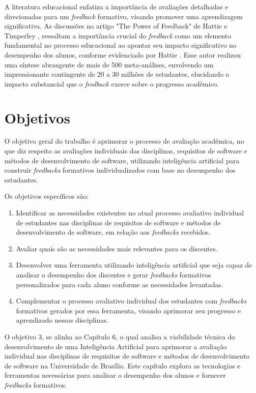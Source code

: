 A literatura educacional enfatiza a importância de avaliações detalhadas e direcionadas para um \textit{feedback} formativo, visando promover uma aprendizagem significativa. As discussões no artigo "The Power of Feedback" de Hattie e Timperley \cite{hattie2007}, ressaltam a importância crucial do \textit{feedback} como um elemento fundamental no processo educacional ao apontar seu impacto significativo no desempenho dos alunos, conforme evidenciado por Hattie \cite{hattie2007}. Esse autor realizou uma síntese abrangente de mais de 500 meta-análises, envolvendo um impressionante contingente de 20 a 30 milhões de estudantes, elucidando o impacto substancial que o \textit{feedback} exerce sobre o progresso acadêmico. 

\section{Objetivos}

O objetivo geral do trabalho  é aprimorar o processo de avaliação acadêmica, no que diz respeito as avaliações individuais das disciplinas, requisitos de software e métodos de desenvolvimento de software, utilizando inteligência artificial para construir \textit{feedbacks} formativos individualizados com base no desempenho dos estudantes.

Os objetivos específicos são:

\begin{enumerate}
  \item Identificar as necessidades existentes no atual processo avaliativo individual de estudantes nas disciplinas de requisitos de software e métodos de desenvolvimento de software, em relação aos \textit{feedbacks} recebidos.
  \item Avaliar quais são as necessidades mais relevantes para os discentes.
  \item Desenvolver uma ferramenta utilizando inteligência artificial que seja capaz de analisar o desempenho dos discentes e gerar \textit{feedbacks} formativos personalizados para cada aluno conforme as necessidades levantadas.
  \item Complementar o processo avaliativo individual dos estudantes com \textit{feedbacks} formativos gerados por essa ferramenta, visando aprimorar seu progresso e aprendizado nessas disciplinas.
\end{enumerate}

O objetivo 3, se alinha ao Capítulo 6, o qual analisa a viabilidade técnica do desenvolvimento de uma Inteligência Artificial para aprimorar a avaliação individual nas disciplinas de requisitos de software e métodos de desenvolvimento de software na Universidade de Brasília. Este capítulo explora as tecnologias e ferramentas necessárias para analisar o desempenho dos alunos e fornecer \textit{feedbacks} formativos.

